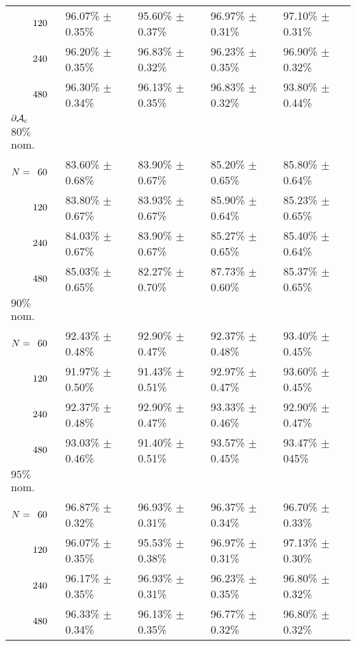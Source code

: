 \begin{table}[htbp]
\begin{tabular}{@{}p{}*{4}{L{\tabcolsep\relax}}@{}}
$\hphantom{N{}={}}120$ & 96.07\% $\pm$ 0.35\% & 95.60\% $\pm$ 0.37\% & 96.97\% $\pm$ 0.31\% & 97.10\% $\pm$ 0.31\% \\[-0.4em]
$\hphantom{N{}={}}240$ & 96.20\% $\pm$ 0.35\% & 96.83\% $\pm$ 0.32\% & 96.23\% $\pm$ 0.35\% & 96.90\% $\pm$ 0.32\% \\[-0.4em]
$\hphantom{N{}={}}480$ & 96.30\% $\pm$ 0.34\% & 96.13\% $\pm$ 0.35\% & 96.83\% $\pm$ 0.32\% & 93.80\% $\pm$ 0.44\%\\
\midrule
$\mathbf{\operatorname{\partial\mathcal{A}_{c}}}$\\[-0.4em]
$80\%$ nom.\\[-0.4em]
$N = \hphantom{1}60$ & 83.60\% $\pm$ 0.68\% & 83.90\% $\pm$ 0.67\% & 85.20\% $\pm$ 0.65\% & 85.80\% $\pm$ 0.64\% \\[-0.4em]
$\hphantom{N{}={}}120$ & 83.80\% $\pm$ 0.67\% & 83.93\% $\pm$ 0.67\% & 85.90\% $\pm$ 0.64\% & 85.23\% $\pm$ 0.65\%\\[-0.4em]
$\hphantom{N{}={}}240$ & 84.03\% $\pm$ 0.67\% & 83.90\% $\pm$ 0.67\% & 85.27\% $\pm$ 0.65\% & 85.40\% $\pm$ 0.64\% \\[-0.4em]
$\hphantom{N{}={}}480$ & 85.03\% $\pm$ 0.65\% & 82.27\% $\pm$ 0.70\% & 87.73\% $\pm$ 0.60\% & 85.37\% $\pm$ 0.65\%\\ 
$90\%$ nom.  \\[-0.4em]
$N = \hphantom{1}60$ & 92.43\% $\pm$ 0.48\% & 92.90\% $\pm$ 0.47\% & 92.37\% $\pm$ 0.48\% & 93.40\% $\pm$ 0.45\% \\[-0.4em]
$\hphantom{N{}={}}120$ & 91.97\% $\pm$ 0.50\% & 91.43\% $\pm$ 0.51\% & 92.97\% $\pm$ 0.47\% & 93.60\% $\pm$ 0.45\% \\[-0.4em]
$\hphantom{N{}={}}240$ & 92.37\% $\pm$ 0.48\% & 92.90\% $\pm$ 0.47\% & 93.33\% $\pm$ 0.46\% & 92.90\% $\pm$ 0.47\% \\[-0.4em]
$\hphantom{N{}={}}480$ & 93.03\% $\pm$ 0.46\% & 91.40\% $\pm$ 0.51\% & 93.57\% $\pm$ 0.45\% & 93.47\% $\pm$ 045\%\\ 
$95\%$ nom.  \\[-0.4em]
$N = \hphantom{1}60$ & 96.87\% $\pm$ 0.32\% & 96.93\% $\pm$ 0.31\% & 96.37\% $\pm$ 0.34\% & 96.70\% $\pm$ 0.33\% \\[-0.4em]
$\hphantom{N{}={}}120$ & 96.07\% $\pm$ 0.35\% & 95.53\% $\pm$ 0.38\% & 96.97\% $\pm$ 0.31\% & 97.13\% $\pm$ 0.30\% \\[-0.4em]
$\hphantom{N{}={}}240$ & 96.17\% $\pm$ 0.35\% & 96.93\% $\pm$ 0.31\% & 96.23\% $\pm$ 0.35\% & 96.80\% $\pm$ 0.32\% \\[-0.4em]
$\hphantom{N{}={}}480$ & 96.33\% $\pm$ 0.34\% & 96.13\% $\pm$ 0.35\% & 96.77\% $\pm$ 0.32\% & 96.80\% $\pm$ 0.32\% \\
\bottomrule
\end{tabular}
\end{table}

